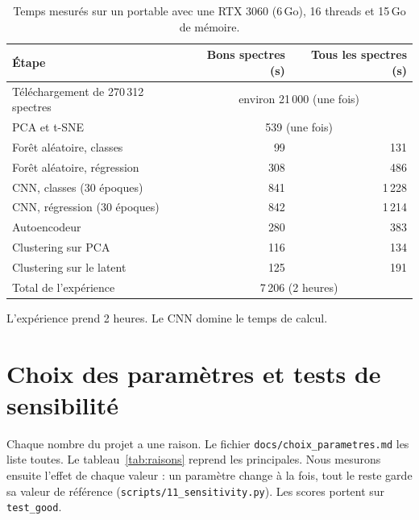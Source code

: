 \documentclass[11pt,a4paper]{article}
\begin{document}
\begin{table}[H]
\centering
\begin{tabular}{lrr}
\toprule
Étape & Bons spectres (s) & Tous les spectres (s) \\
\midrule
Téléchargement de 270\,312 spectres & \multicolumn{2}{c}{environ 21\,000 (une fois)} \\
PCA et t-SNE & \multicolumn{2}{c}{539 (une fois)} \\
Forêt aléatoire, classes & 99 & 131 \\
Forêt aléatoire, régression & 308 & 486 \\
CNN, classes (30 époques) & 841 & 1\,228 \\
CNN, régression (30 époques) & 842 & 1\,214 \\
Autoencodeur & 280 & 383 \\
Clustering sur PCA & 116 & 134 \\
Clustering sur le latent & 125 & 191 \\
\midrule
Total de l'expérience & \multicolumn{2}{c}{7\,206 (2 heures)} \\
\bottomrule
\end{tabular}
\caption{Temps mesurés sur un portable avec une RTX 3060 (6\,Go), 16 threads et 15\,Go de mémoire.}
\end{table}

L'expérience prend 2 heures. Le CNN domine le temps de calcul.

\section{Choix des paramètres et tests de sensibilité}
\label{sec:sensibilite}

Chaque nombre du projet a une raison. Le fichier \texttt{docs/choix\_parametres.md} les liste toutes. Le tableau~\ref{tab:raisons} reprend les principales. Nous mesurons ensuite l'effet de chaque valeur : un paramètre change à la fois, tout le reste garde sa valeur de référence (\texttt{scripts/11\_sensitivity.py}). Les scores portent sur \texttt{test\_good}.
\end{document}
